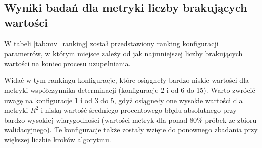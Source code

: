 \FloatBarrier
\subsection{Wyniki badań dla metryki liczby brakujących wartości}
W tabeli \ref{tab:mv_ranking} został przedstawiony ranking konfiguracji parametrów, w którym miejsce zależy od jak najmniejszej liczby brakujących wartości na koniec procesu uzupełniania. 

Widać w tym rankingu konfiguracje, które osiągneły bardzo niskie wartości dla metryki współczynnika determinacji (konfiguracje 2 i od 6 do 15). Warto zwrócić uwagę na konfiguracje 1 i od 3 do 5, gdyż osiągneły one wysokie wartości dla metryki $R^{2}$ i niską wartość średniego procentowego błędu absolutnego przy bardzo wysokiej wiarygodności (wartości metryk dla ponad 80\% próbek ze zbioru walidacyjnego). Te konfiguracje także zostały wzięte do ponownego zbadania przy większej liczbie kroków algorytmu.
